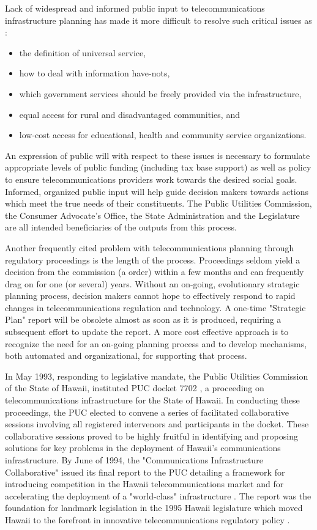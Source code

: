 Lack of widespread and informed public input to telecommunications
infrastructure planning has made it more difficult to resolve such critical
issues as \cite{NII95}:
 
\begin{itemize} 
\item the definition of universal service, 
\item how to deal with information have-nots, 
\item which government services should be freely provided via the infrastructure, 
\item equal access for rural and disadvantaged communities, and 
\item low-cost access for educational, health and community service organizations. 
\end{itemize} 
 
An expression of public will with respect to these issues is necessary to
formulate appropriate levels of public funding (including tax base support)
as well as policy to ensure telecommunications providers work towards the
desired social goals.  Informed, organized public input will help guide
decision makers towards actions which meet the true needs of their
constituents. The Public Utilities Commission, the Consumer Advocate's
Office, the State Administration and the Legislature are all intended
beneficiaries of the outputs from this process.
 
Another frequently cited problem with telecommunications planning through regulatory proceedings is the length of the process.  Proceedings seldom yield a decision from the commission (a order) within a few months and can frequently drag on for one (or several) years.  Without an on-going, evolutionary strategic planning process, decision makers cannot hope to effectively respond to rapid changes in telecommunications regulation and technology.  A one-time "Strategic Plan" report will be obsolete almost as soon as it is produced, requiring a subsequent effort to update the report.  A more cost effective approach is to recognize the need for an on-going planning process and to develop mechanisms, both automated and organizational, for supporting that process. 
 
In May 1993, responding to legislative mandate, the Public Utilities
Commission of the State of Hawaii, instituted PUC docket 7702 \cite{PUC93},
a proceeding on telecommunications infrastructure for the
State of Hawaii. In conducting these proceedings,
the PUC elected to convene a series of facilitated collaborative sessions
involving all registered intervenors and participants in the docket.  These
collaborative sessions proved to be highly fruitful in identifying and
proposing solutions for key problems in the deployment of Hawaii's
communications infrastructure.  By June of 1994, the "Communications
Infrastructure Collaborative" issued its final report to the PUC detailing
a framework for introducing competition in the Hawaii telecommunications
market and for accelerating the deployment of a "world-class"
infrastructure \cite{PUC95}.  The report was the foundation for landmark legislation in
the 1995 Hawaii legislature which moved Hawaii to the forefront in
innovative telecommunications regulatory policy \cite{HI95}. 
 
